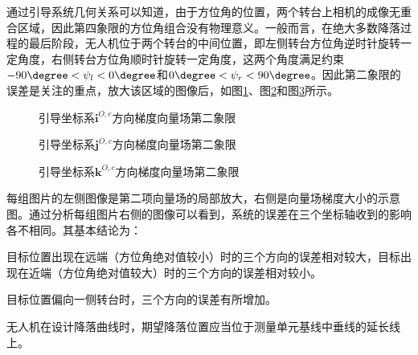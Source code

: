 通过引导系统几何关系可以知道，由于方位角的位置，两个转台上相机的成像无重合区域，因此第四象限的方位角组合没有物理意义。一般而言，在绝大多数降落过程的最后阶段，无人机位于两个转台的中间位置，即左侧转台方位角逆时针旋转一定角度，右侧转台方位角顺时针旋转一定角度，这两个角度满足约束
$ -90\degree < \psi_l < 0\degree$和$ 0\degree < \psi_r < 90\degree$。因此第二象限的误差是关注的重点，放大该区域的图像后，如图\ref{fig:chp03_vision_06_glide_3_x_with_theta_l_r_2_quadrant}、图\ref{fig:chp03_vision_07_glide_3_y_with_theta_l_r_2_quadrant}和图\ref{fig:chp03_vision_08_glide_3_z_with_theta_l_r_2_quadrant}所示。

\begin{figure}[htb]
	\centering
	 \qquad
	\caption{引导坐标系$\mathbf{i}^{O,c}$方向梯度向量场第二象限}
	\label{fig:chp03_vision_06_glide_3_x_with_theta_l_r_2_quadrant}
\end{figure}

\begin{figure}[htb]
	\centering
	 \qquad
	\caption{引导坐标系$\mathbf{j}^{O,c}$方向梯度向量场第二象限}
	\label{fig:chp03_vision_07_glide_3_y_with_theta_l_r_2_quadrant}
\end{figure}

\begin{figure}[htb]
	\centering
	 \qquad
	\caption{引导坐标系$\mathbf{k}^{O,c}$方向梯度向量场第二象限}
	\label{fig:chp03_vision_08_glide_3_z_with_theta_l_r_2_quadrant}
\end{figure}

每组图片的左侧图像是第二项向量场的局部放大，右侧是向量场梯度大小的示意图。通过分析每组图片右侧的图像可以看到，系统的误差在三个坐标轴收到的影响各不相同。其基本结论为：

\begin{compactenum}
	\item
	目标位置出现在远端（方位角绝对值较小）时的三个方向的误差相对较大，目标出现在近端（方位角绝对值较大）时的三个方向的误差相对较小。
	\item
	目标位置偏向一侧转台时，三个方向的误差有所增加。
	\item
	无人机在设计降落曲线时，期望降落位置应当位于测量单元基线中垂线的延长线上。
\end{compactenum}



